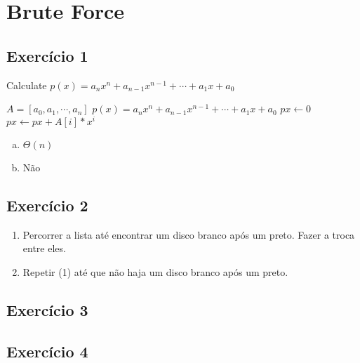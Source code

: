 \section{Brute Force}\label{sec:brute_force}

\subsection{Exercício 1}\label{sec:exer1}

\begin{algorithm}
  \caption{Calculate $p(x) = a_{n}x{^n}+a_{n-1}x^{n-1}+\cdots+a_{1}x+a_{0}$}
  \begin{algorithmic}
    \REQUIRE $A=[a_{0}, a_{1}, \cdots, a_{n}]$
    \ENSURE $p(x) = a_{n}x{^n}+a_{n-1}x^{n-1}+\cdots+a_{1}x+a_{0}$
    \STATE $px \leftarrow 0$
      \STATE $px \leftarrow px + A[i]*x^{i}$
    \ENDFOR
  \end{algorithmic}
\end{algorithm}

\begin{enumerate}[a)]
  \item $\Theta(n)$
  \item Não
\end{enumerate}

\subsection{Exercício 2}\label{sec:exer2}

\begin{enumerate}
  \item Percorrer a lista até encontrar um disco branco após um preto. Fazer a
  troca entre eles.
  \item Repetir (1) até que não haja um disco branco após um preto.
\end{enumerate}



\subsection{Exercício 3}\label{sec:exer3}

\subsection{Exercício 4}\label{sec:exer4}

